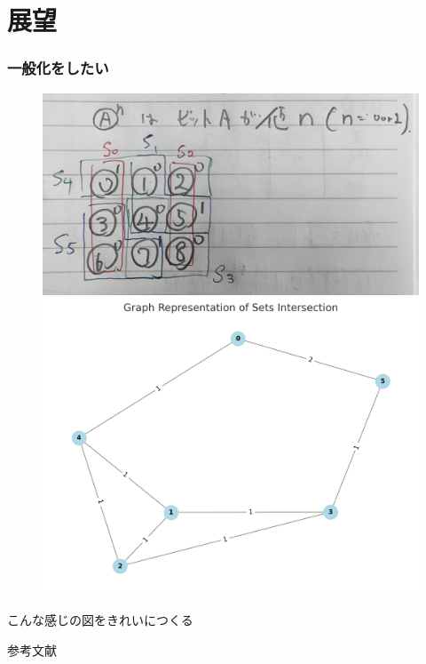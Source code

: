 \section{展望}
\begin{frame}
  \frametitle{一般化をしたい}
  \begin{figure}
    \includegraphics[width=0.47\linewidth]{data/rakugaki1.jpg}
    \includegraphics[width=0.47\linewidth]{data/graph1.png}
  \end{figure}
  こんな感じの図をきれいにつくる
\end{frame}


\begin{frame}[t]{参考文献}
  \footnotesize

  
  
\end{frame}



